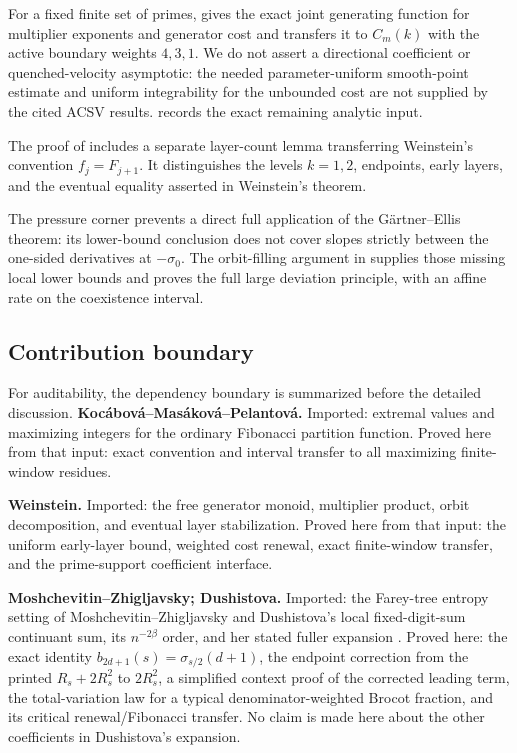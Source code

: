 For a fixed finite set of primes,  gives
the exact joint generating function for multiplier exponents and generator
cost and transfers it to \(C_m(k)\) with the active boundary weights
\(4,3,1\).  We do not assert a directional coefficient or quenched-velocity
asymptotic: the needed parameter-uniform smooth-point estimate and uniform
integrability for the unbounded cost are not supplied by the cited ACSV
results.   records the exact
remaining analytic input.

The proof of  includes a separate
layer-count lemma transferring Weinstein's convention \(f_j=F_{j+1}\).  It
distinguishes the levels \(k=1,2\), endpoints, early layers, and the eventual
equality asserted in Weinstein's theorem.

The pressure corner prevents a direct full application of the
G\"artner--Ellis theorem: its lower-bound conclusion does not cover slopes
strictly between the one-sided derivatives at \(-\sigma_0\).  The
orbit-filling argument in  supplies those missing
local lower bounds and proves the full large deviation principle, with an
affine rate on the coexistence interval.

\subsection{Contribution boundary}

For auditability, the dependency boundary is summarized before the detailed
discussion.
\noindent\textbf{Koc\'abov\'a--Mas\'akov\'a--Pelantov\'a.}
Imported: extremal values and maximizing integers for the ordinary Fibonacci
partition function.  Proved here from that input: exact convention and
interval transfer to all maximizing finite-window residues.

\noindent\textbf{Weinstein.}
Imported: the free generator monoid, multiplier product, orbit decomposition,
and eventual layer stabilization.  Proved here from that input: the uniform
early-layer bound, weighted cost renewal, exact finite-window transfer, and
the prime-support coefficient interface.

\noindent\textbf{Moshchevitin--Zhigljavsky; Dushistova.}
Imported: the Farey-tree entropy setting of Moshchevitin--Zhigljavsky and
Dushistova's local fixed-digit-sum continuant sum, its \(n^{-2\beta}\) order,
and her stated fuller expansion
\cite{MoshchevitinZhigljavsky2004,Dushistova2007}.  Proved here: the exact
identity \(b_{2d+1}(s)=\sigma_{s/2}(d+1)\), the endpoint correction from the
printed \(R_s+2R_s^2\) to \(2R_s^2\), a simplified context proof of the
corrected leading term, the total-variation law for a typical
denominator-weighted Brocot fraction, and its critical renewal/Fibonacci
transfer.  No claim is made here about the other coefficients in
Dushistova's expansion.

